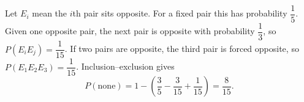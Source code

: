 Let $E_i$ mean the $i$th pair sits opposite. For a fixed pair this has probability $\dfrac{1}{5}$. Given one opposite pair, the next pair is opposite with probability $\dfrac{1}{3}$, so $P(E_iE_j)=\dfrac{1}{15}$. If two pairs are opposite, the third pair is forced opposite, so $P(E_1E_2E_3)=\dfrac{1}{15}$. Inclusion--exclusion gives
\[P(\text{none})=1-\left(\dfrac{3}{5}-\dfrac{3}{15}+\dfrac{1}{15}\right)=\boxed{\dfrac{8}{15}}.\]

